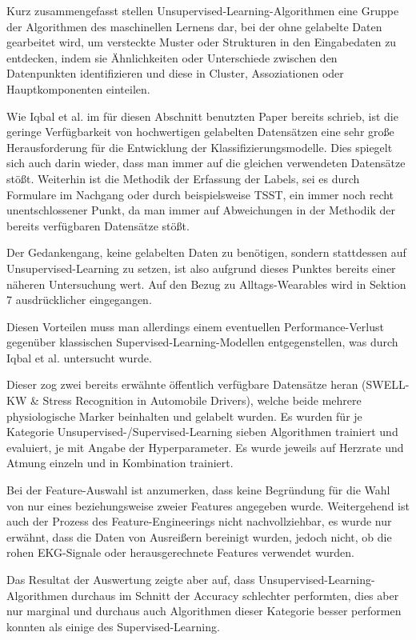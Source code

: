 Kurz zusammengefasst stellen Unsupervised-Learning-Algorithmen eine Gruppe der Algorithmen des maschinellen Lernens dar, bei der ohne gelabelte Daten gearbeitet wird, um versteckte Muster oder Strukturen in den Eingabedaten zu entdecken, indem sie Ähnlichkeiten oder Unterschiede zwischen den Datenpunkten identifizieren und diese in Cluster, Assoziationen oder Hauptkomponenten einteilen.

Wie Iqbal et al. im für diesen Abschnitt benutzten Paper \cite{Iqbal2022} bereits schrieb, ist die geringe Verfügbarkeit von hochwertigen gelabelten Datensätzen eine sehr große Herausforderung für die Entwicklung der Klassifizierungsmodelle. Dies spiegelt sich auch darin wieder, dass man immer auf die gleichen verwendeten Datensätze stößt. Weiterhin ist die Methodik der Erfassung der Labels, sei es durch Formulare im Nachgang oder durch beispielsweise \ac{TSST}, ein immer noch recht unentschlossener Punkt, da man immer auf Abweichungen in der Methodik der bereits verfügbaren Datensätze stößt.

Der Gedankengang, keine gelabelten Daten zu benötigen, sondern stattdessen auf Unsupervised-Learning zu setzen, ist also aufgrund dieses Punktes bereits einer näheren Untersuchung wert. Auf den Bezug zu Alltags-Wearables wird in Sektion 7 ausdrücklicher eingegangen.

Diesen Vorteilen muss man allerdings einem eventuellen Performance-Verlust gegenüber klassischen Supervised-Learning-Modellen entgegenstellen, was durch Iqbal et al. untersucht wurde.

Dieser zog zwei bereits erwähnte öffentlich verfügbare Datensätze heran (SWELL-KW \& Stress Recognition in Automobile Drivers), welche beide mehrere physiologische Marker beinhalten und gelabelt wurden. Es wurden für je Kategorie Unsupervised-/Supervised-Learning sieben Algorithmen trainiert und evaluiert, je mit Angabe der Hyperparameter. Es wurde jeweils auf Herzrate und Atmung einzeln und in Kombination trainiert.

Bei der Feature-Auswahl ist anzumerken, dass keine Begründung für die Wahl von nur eines beziehungsweise zweier Features angegeben wurde. Weitergehend ist auch der Prozess des Feature-Engineerings nicht nachvollziehbar, es wurde nur erwähnt, dass die Daten von Ausreißern bereinigt wurden, jedoch nicht, ob die rohen \ac{EKG}-Signale oder herausgerechnete Features verwendet wurden.

Das Resultat der Auswertung zeigte aber auf, dass Unsupervised-Learning-Algorithmen durchaus im Schnitt der Accuracy schlechter performten, dies aber nur marginal und durchaus auch Algorithmen dieser Kategorie besser performen konnten als einige des Supervised-Learning.

